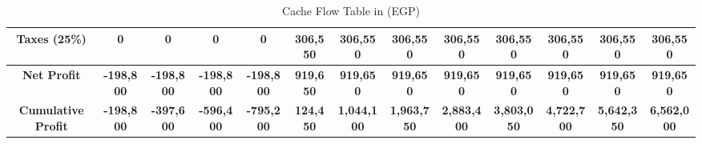 \begin{center}
\begin{table}[!htbp]
{\begin{tabular}{|c|c|c|c|c|c|c|c|c|c|c|c|c|}
\rowcolor[HTML]{FFFFC7}
{\color[HTML]{329A9D} \textbf{Taxes (25\%)}}                                                          & {\color[HTML]{329A9D} \textbf{0}}                  & {\color[HTML]{329A9D} \textbf{0}} & {\color[HTML]{329A9D} \textbf{0}} & {\color[HTML]{329A9D} \textbf{0}} & {\color[HTML]{329A9D} \textbf{306,550}}                                                  & {\color[HTML]{329A9D} \textbf{306,550}}   & {\color[HTML]{329A9D} \textbf{306,550}} & {\color[HTML]{329A9D} \textbf{306,550}} & {\color[HTML]{329A9D} \textbf{306,550}} & {\color[HTML]{329A9D} \textbf{306,550}}  & {\color[HTML]{329A9D} \textbf{306,550}}   & {\color[HTML]{329A9D} \textbf{306,550}} \\ \hline
\rowcolor[HTML]{FFFFC7}
{\color[HTML]{329A9D} \textbf{Net Profit}} & {\color[HTML]{329A9D} \textbf{-198,800}} & {\color[HTML]{329A9D} \textbf{-198,800}} & {\color[HTML]{329A9D} \textbf{-198,800}} & {\color[HTML]{329A9D} \textbf{-198,800}} & {\color[HTML]{329A9D} \textbf{919,650}}                                                  & {\color[HTML]{329A9D} \textbf{919,650}}   & {\color[HTML]{329A9D} \textbf{919,650}} & {\color[HTML]{329A9D} \textbf{919,650}} & {\color[HTML]{329A9D} \textbf{919,650}} & {\color[HTML]{329A9D} \textbf{919,650}}  & {\color[HTML]{329A9D} \textbf{919,650}}   & {\color[HTML]{329A9D} \textbf{919,650}} \\ \hline

\rowcolor[HTML]{FFFFC7}
{\color[HTML]{329A9D} \textbf{Cumulative Profit}}                                                          & {\color[HTML]{329A9D} \textbf{-198,800}}                  & {\color[HTML]{329A9D} \textbf{-397,600}} & {\color[HTML]{329A9D} \textbf{-596,400}} & {\color[HTML]{329A9D} \textbf{-795,200}} & {\color[HTML]{329A9D} \textbf{124,450}}                                                  & {\color[HTML]{329A9D}
\textbf{1,044,100}} & {\color[HTML]{329A9D} \textbf{1,963,750}} & {\color[HTML]{329A9D} \textbf{2,883,400}} & {\color[HTML]{329A9D} \textbf{3,803,050}} & {\color[HTML]{329A9D} \textbf{4,722,700}}  & {\color[HTML]{329A9D} \textbf{5,642,350}} & {\color[HTML]{329A9D} \textbf{6,562,000}} \\ \hline
\end{tabular}
}
\caption{Cache Flow Table in (EGP)}
\label{tbl:cache-flow-table}

\end{table}
\end{center}

